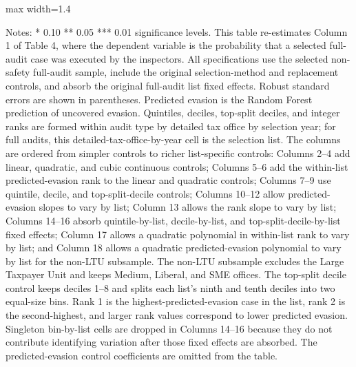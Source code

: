 \documentclass{article}
\newcommand{\OutPath}{Output/}%
\newcommand{\OutPath}{../Output/}%
\begin{document}
\begin{landscape}

\begin{table}[H]\centering
\begin{adjustbox}{max width=1.4\textwidth}
\begin{threeparttable}
\caption{Table 4: Main Results Probability of Execution Varying Predicted Evasion Control Specification}
\label{tab:table4_col1_predicted_evasion_control_comparison}

\footnotesize


\begin{tablenotes}[flushleft]
\footnotesize
\item Notes: * 0.10 ** 0.05 *** 0.01 significance levels. This table re-estimates Column 1 of Table 4, where the dependent variable is the probability that a selected full-audit case was executed by the inspectors. All specifications use the selected non-safety full-audit sample, include the original selection-method and replacement controls, and absorb the original full-audit list fixed effects. Robust standard errors are shown in parentheses. Predicted evasion is the Random Forest prediction of uncovered evasion. Quintiles, deciles, top-split deciles, and integer ranks are formed within audit type by detailed tax office by selection year; for full audits, this detailed-tax-office-by-year cell is the selection list. The columns are ordered from simpler controls to richer list-specific controls: Columns 2--4 add linear, quadratic, and cubic continuous controls; Columns 5--6 add the within-list predicted-evasion rank to the linear and quadratic controls; Columns 7--9 use quintile, decile, and top-split-decile controls; Columns 10--12 allow predicted-evasion slopes to vary by list; Column 13 allows the rank slope to vary by list; Columns 14--16 absorb quintile-by-list, decile-by-list, and top-split-decile-by-list fixed effects; Column 17 allows a quadratic polynomial in within-list rank to vary by list; and Column 18 allows a quadratic predicted-evasion polynomial to vary by list for the non-LTU subsample. The non-LTU subsample excludes the Large Taxpayer Unit and keeps Medium, Liberal, and SME offices. The top-split decile control keeps deciles 1--8 and splits each list's ninth and tenth deciles into two equal-size bins. Rank 1 is the highest-predicted-evasion case in the list, rank 2 is the second-highest, and larger rank values correspond to lower predicted evasion. Singleton bin-by-list cells are dropped in Columns 14--16 because they do not contribute identifying variation after those fixed effects are absorbed. The predicted-evasion control coefficients are omitted from the table.
\end{tablenotes}
\end{threeparttable}
\end{adjustbox}
\end{table}


\end{landscape}
\end{document}
